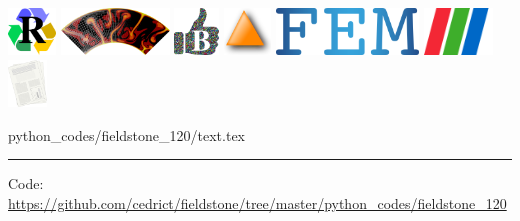 \noindent
\includegraphics[height=1.25cm]{images/pictograms/replication}
\includegraphics[height=1.25cm]{images/pictograms/aspect_logo}
\includegraphics[height=1.25cm]{images/pictograms/benchmark}
\includegraphics[height=1.25cm]{images/pictograms/triangle}
\includegraphics[height=1.25cm]{images/pictograms/FEM}
\includegraphics[height=1.25cm]{images/pictograms/paraview}
\includegraphics[height=1.25cm]{images/pictograms/publication}


\begin{flushright} {\tiny {\color{gray} python\_codes/fieldstone\_120/text.tex}} \end{flushright}

%

\par\noindent\rule{\textwidth}{0.4pt}

\begin{center}
\inpython
{\small Code: \url{https://github.com/cedrict/fieldstone/tree/master/python_codes/fieldstone_120}}
\end{center}

